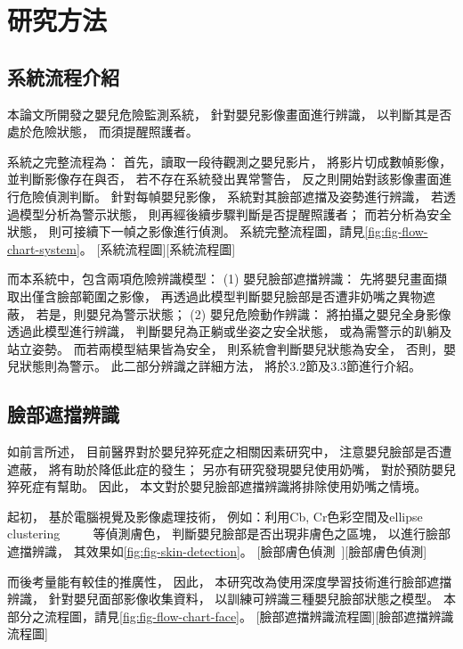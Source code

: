 \documentclass[class=NCU_thesis, crop=false]{standalone}
\begin{document}
\chapter{研究方法}

\section{系統流程介紹}
本論文所開發之嬰兒危險監測系統，
針對嬰兒影像畫面進行辨識，
以判斷其是否處於危險狀態，
而須提醒照護者。

系統之完整流程為：
首先，讀取一段待觀測之嬰兒影片，
將影片切成數幀影像，
並判斷影像存在與否，
若不存在系統發出異常警告，
反之則開始對該影像畫面進行危險偵測判斷。
針對每幀嬰兒影像，
系統對其臉部遮擋及姿勢進行辨識，
若透過模型分析為警示狀態，
則再經後續步驟判斷是否提醒照護者；
而若分析為安全狀態，
則可接續下一幀之影像進行偵測。
系統完整流程圖，請見\cref{fig:fig-flow-chart-system}。
[系統流程圖][系統流程圖]

而本系統中，包含兩項危險辨識模型：
(1) 嬰兒臉部遮擋辨識：
先將嬰兒畫面擷取出僅含臉部範圍之影像，
再透過此模型判斷嬰兒臉部是否遭非奶嘴之異物遮蔽，
若是，則嬰兒為警示狀態；
(2) 嬰兒危險動作辨識：
將拍攝之嬰兒全身影像透過此模型進行辨識，
判斷嬰兒為正躺或坐姿之安全狀態，
或為需警示的趴躺及站立姿勢。
而若兩模型結果皆為安全，
則系統會判斷嬰兒狀態為安全，
否則，嬰兒狀態則為警示。
此二部分辨識之詳細方法，
將於3.2節及3.3節進行介紹。

\section{臉部遮擋辨識}
如前言所述，
目前醫界對於嬰兒猝死症之相關因素研究中，
注意嬰兒臉部是否遭遮蔽，
將有助於降低此症的發生；
另亦有研究發現嬰兒使用奶嘴，
對於預防嬰兒猝死症有幫助。
因此，
本文對於嬰兒臉部遮擋辨識將排除使用奶嘴之情境。

起初，
基於電腦視覺及影像處理技術，
例如：利用Cb, Cr色彩空間及ellipse clustering
~\cite{tang_hands_2008}~\cite{li_face_2011}~\cite{noauthor_python_nodate}~\cite{walkonnet_python_nodate}
等偵測膚色，
判斷嬰兒臉部是否出現非膚色之區塊，
以進行臉部遮擋辨識，
其效果如\cref{fig:fig-skin-detection}。
[臉部膚色偵測~\cite{walkonnet_python_nodate}][臉部膚色偵測]

而後考量能有較佳的推廣性，
因此，
本研究改為使用深度學習技術進行臉部遮擋辨識，
針對嬰兒面部影像收集資料，
以訓練可辨識三種嬰兒臉部狀態之模型。
本部分之流程圖，請見\cref{fig:fig-flow-chart-face}。
[臉部遮擋辨識流程圖][臉部遮擋辨識流程圖]
\end{document}
